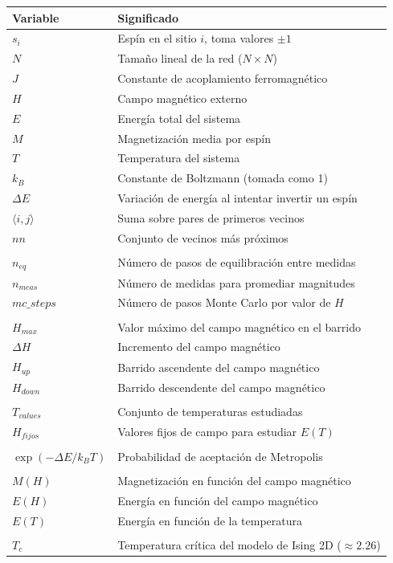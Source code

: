 \documentclass[12pt]{article}
\begin{document}
\begin{center}
\begin{tabular}{ll}
\hline
\textbf{Variable} & \textbf{Significado} \\
\hline
$s_i$ & Espín en el sitio $i$, toma valores $\pm 1$ \\
$N$ & Tamaño lineal de la red ($N \times N$) \\
$J$ & Constante de acoplamiento ferromagnético \\
$H$ & Campo magnético externo \\
$E$ & Energía total del sistema \\
$M$ & Magnetización media por espín \\
$T$ & Temperatura del sistema \\
$k_B$ & Constante de Boltzmann (tomada como 1) \\
$\Delta E$ & Variación de energía al intentar invertir un espín \\
$\langle i,j \rangle$ & Suma sobre pares de primeros vecinos \\
$nn$ & Conjunto de vecinos más próximos \\
\\
$n_{eq}$ & Número de pasos de equilibración entre medidas \\
$n_{meas}$ & Número de medidas para promediar magnitudes \\
$mc\_steps$ & Número de pasos Monte Carlo por valor de $H$ \\
\\
$H_{max}$ & Valor máximo del campo magnético en el barrido \\
$\Delta H$ & Incremento del campo magnético \\
$H_{up}$ & Barrido ascendente del campo magnético \\
$H_{down}$ & Barrido descendente del campo magnético \\
\\
$T_{values}$ & Conjunto de temperaturas estudiadas \\
$H_{fijos}$ & Valores fijos de campo para estudiar $E(T)$ \\
\\
$\exp(-\Delta E / k_B T)$ & Probabilidad de aceptación de Metropolis \\
\\
$M(H)$ & Magnetización en función del campo magnético \\
$E(H)$ & Energía en función del campo magnético \\
$E(T)$ & Energía en función de la temperatura \\
\\
$T_c$ & Temperatura crítica del modelo de Ising 2D ($\approx 2.26$) \\
\hline
\end{tabular}
\end{center}
\end{document}
